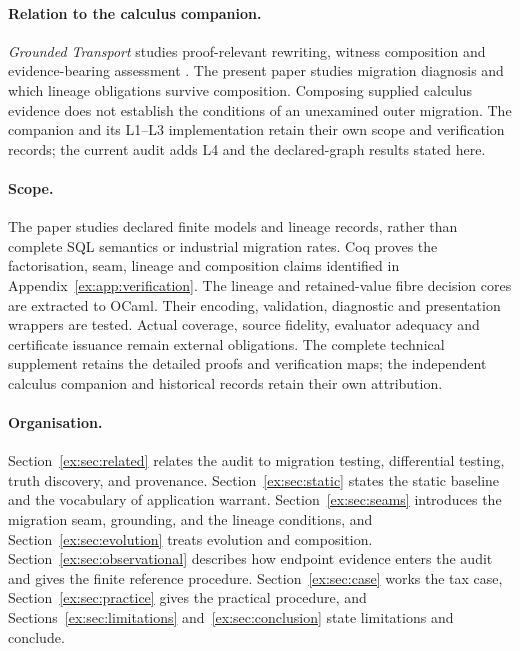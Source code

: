 \documentclass[twocolumn,envcountsect,envcountsame,natbib]{svjour3}
\begin{document}
\paragraph{Relation to the calculus companion.} \emph{Grounded Transport} studies proof-relevant rewriting, witness composition and evidence-bearing assessment \citep{moore2026transport}. The present paper studies migration diagnosis and which lineage obligations survive composition. Composing supplied calculus evidence does not establish the conditions of an unexamined outer migration. The companion and its L1--L3 implementation retain their own scope and verification records; the current audit adds L4 and the declared-graph results stated here.

\paragraph{Scope.} The paper studies declared finite models and lineage records, rather than complete SQL semantics or industrial migration rates. Coq proves the factorisation, seam, lineage and composition claims identified in Appendix~\ref{ex:app:verification}. The lineage and retained-value fibre decision cores are extracted to OCaml. Their encoding, validation, diagnostic and presentation wrappers are tested. Actual coverage, source fidelity, evaluator adequacy and certificate issuance remain external obligations. The complete technical supplement retains the detailed proofs and verification maps; the independent calculus companion and historical records retain their own attribution.

\paragraph{Organisation.} Section~\ref{ex:sec:related} relates the audit to migration testing, differential testing, truth discovery, and provenance. Section~\ref{ex:sec:static} states the static baseline and the vocabulary of application warrant. Section~\ref{ex:sec:seams} introduces the migration seam, grounding, and the lineage conditions, and Section~\ref{ex:sec:evolution} treats evolution and composition. Section~\ref{ex:sec:observational} describes how endpoint evidence enters the audit and gives the finite reference procedure. Section~\ref{ex:sec:case} works the tax case, Section~\ref{ex:sec:practice} gives the practical procedure, and Sections~\ref{ex:sec:limitations} and~\ref{ex:sec:conclusion} state limitations and conclude.
\end{document}
